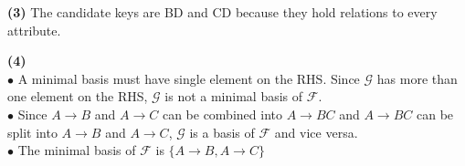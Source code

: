\documentclass[a4paper, 11pt]{article}
\renewcommand{\part}[1] {\vspace{.10in} {\bf (#1)}}
\begin{document}
\part{3}
The candidate keys are BD and CD because they hold relations to every attribute.

\part{4} \\
$\bullet$
A minimal basis must have single element on the RHS. Since $\mathcal{G}$ has more than one element on the RHS, $\mathcal{G}$ is not a minimal basis of $\mathcal{F}$. \\ 
$\bullet$
Since $A \rightarrow B$ and $A\rightarrow C$ can be combined into $A \rightarrow BC$ and $A \rightarrow BC$ can be split into $A \rightarrow B$ and $A\rightarrow C$, $\mathcal{G}$ is a basis of $\mathcal{F}$ and vice versa. \\
$\bullet$
The minimal basis of $\mathcal{F}$ is $\{A \rightarrow B, A \rightarrow C\}$
\end{document}
